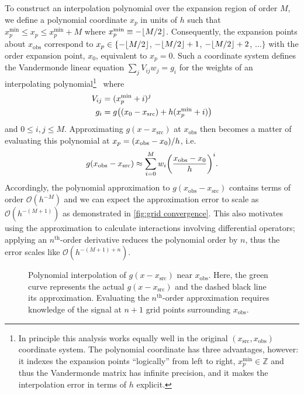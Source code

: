 To construct an interpolation polynomial over the expansion region of order $M$, we define a polynomial coordinate $x_p$ in units of $h$ such that $x_p^\text{min} \leqslant x_p \leqslant x_p^\text{min} + M$ where $x_p^\text{min} \equiv -\floor*{M/2}$.
Consequently, the expansion points about $x_\text{obs}$ correspond to $x_p \in \{-\floor*{M/2}$, $-\floor*{M/2} + 1$, $-\floor*{M/2} + 2$, $\ldots\}$ with the  order expansion point, $x_0$, equivalent to $x_p = 0$.
Such a coordinate system defines the Vandermonde linear equation $\sum_{j}V_{ij} w_j = g_i$ for the weights of an interpolating polynomial\footnote{In principle this analysis works equally well in the original $(x_\text{src}, x_\text{obs})$ coordinate system. The polynomial coordinate has three advantages, however: it indexes the expansion points ``logically'' from left to right, $x_p^\text{min} \in \mathbb{Z}$ and thus the Vandermonde matrix has infinite precision, and it makes the interpolation error in terms of $h$ explicit.}~\cite{NumericalRecipes} where
\begin{subequations}
  \begin{align}
    V_{ij} &= (x_p^\text{min} + i)^j \\
    g_i &= g\qty((x_0 - x_\text{src}) + h(x_p^\text{min} + i))
  \end{align}
\end{subequations}
and $0 \leqslant i, j \leqslant M$.
Approximating $g(x - x_\text{src})$ at $x_\text{obs}$ then becomes a matter of evaluating this polynomial at $x_p = \qty(x_\text{obs} - x_0)/h$, i.e.
\begin{equation}
  g(x_\text{obs} - x_\text{src}) \approx \sum_{i = 0}^{M} w_i \qty(\frac{x_\text{obs} - x_0}{h})^i.
\end{equation}
Accordingly, the polynomial approximation to $g(x_\text{obs} - x_\text{src})$ contains terms of order $\mathcal{O}(h^{-M})$ and we can expect the approximation error to scale as $\mathcal{O}(h^{-(M + 1)})$ as demonstrated in \cref{fig:grid convergence}.
This also motivates using the approximation to calculate interactions involving differential operators; applying an $n^\text{th}$-order derivative reduces the polynomial order by $n$, thus the error scales like $\mathcal{O}(h^{-(M + 1) + n})$.

\begin{figure}
  \centering
  
  \caption{\label{fig:1d moments} Polynomial interpolation of $g(x - x_\text{src})$ near $x_\text{obs}$.
    Here, the green curve represents the actual $g(x - x_\text{src})$ and the dashed black line its approximation.
    Evaluating the $n^\text{th}$-order approximation requires knowledge of the signal at $n + 1$ grid points surrounding $x_\text{obs}$.
  }
\end{figure}


